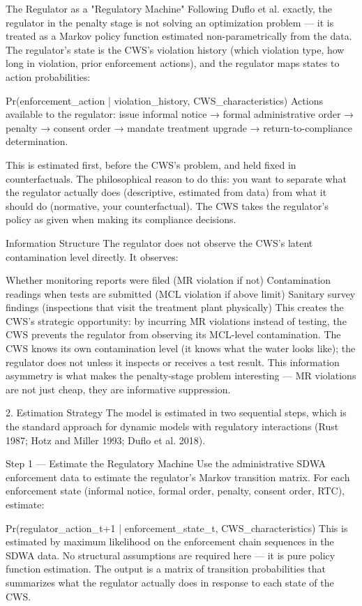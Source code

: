 The Regulator as a "Regulatory Machine"
Following Duflo et al. exactly, the regulator in the penalty stage is not solving an optimization problem — it is treated as a Markov policy function estimated non-parametrically from the data. The regulator's state is the CWS's violation history (which violation type, how long in violation, prior enforcement actions), and the regulator maps states to action probabilities:


Pr(enforcement_action | violation_history, CWS_characteristics)
Actions available to the regulator: issue informal notice → formal administrative order → penalty → consent order → mandate treatment upgrade → return-to-compliance determination.

This is estimated first, before the CWS's problem, and held fixed in counterfactuals. The philosophical reason to do this: you want to separate what the regulator actually does (descriptive, estimated from data) from what it should do (normative, your counterfactual). The CWS takes the regulator's policy as given when making its compliance decisions.

Information Structure
The regulator does not observe the CWS's latent contamination level directly. It observes:

Whether monitoring reports were filed (MR violation if not)
Contamination readings when tests are submitted (MCL violation if above limit)
Sanitary survey findings (inspections that visit the treatment plant physically)
This creates the CWS's strategic opportunity: by incurring MR violations instead of testing, the CWS prevents the regulator from observing its MCL-level contamination. The CWS knows its own contamination level (it knows what the water looks like); the regulator does not unless it inspects or receives a test result. This information asymmetry is what makes the penalty-stage problem interesting — MR violations are not just cheap, they are informative suppression.

2. Estimation Strategy
The model is estimated in two sequential steps, which is the standard approach for dynamic models with regulatory interactions (Rust 1987; Hotz and Miller 1993; Duflo et al. 2018).

Step 1 — Estimate the Regulatory Machine
Use the administrative SDWA enforcement data to estimate the regulator's Markov transition matrix. For each enforcement state (informal notice, formal order, penalty, consent order, RTC), estimate:


Pr(regulator_action_{t+1} | enforcement_state_t, CWS_characteristics)
This is estimated by maximum likelihood on the enforcement chain sequences in the SDWA data. No structural assumptions are required here — it is pure policy function estimation. The output is a matrix of transition probabilities that summarizes what the regulator actually does in response to each state of the CWS.

